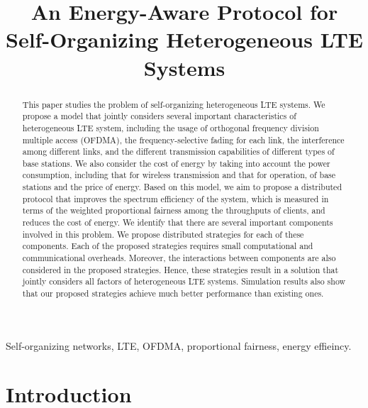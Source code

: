 \documentclass[conference]{IEEEtran}
\begin{document}
\title{An Energy-Aware Protocol for Self-Organizing Heterogeneous LTE Systems}
\author{
}

\maketitle


\begin{abstract}
This paper studies the problem of self-organizing heterogeneous LTE systems. We propose a model that jointly considers several important characteristics of heterogeneous LTE system, including the usage of orthogonal frequency division multiple access (OFDMA), the frequency-selective fading for each link, the interference among different links, and the different transmission capabilities of different types of base stations. We also consider the cost of energy by taking into account the power consumption, including that for wireless transmission and that for operation, of base stations and the price of energy. 
Based on this model, we aim to propose a distributed protocol that improves the spectrum efficiency of the system, which is measured in terms of the weighted proportional fairness among the throughputs of clients, and reduces the cost of energy. We identify that there are several important components involved in this problem. We propose distributed strategies for each of these components. Each of the proposed strategies requires small computational and communicational overheads. Moreover, the interactions between components are also considered in the proposed strategies. Hence, these strategies result in a solution that jointly considers all factors of heterogeneous LTE systems. Simulation results also show that our proposed strategies achieve much better performance than existing ones.
\end{abstract}

\begin{IEEEkeywords}
Self-organizing networks, LTE, OFDMA, proportional fairness, energy effieincy.
\end{IEEEkeywords}

\section{Introduction}  
\label{section:introduction}
\end{document}

